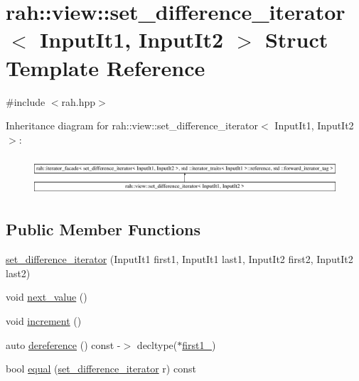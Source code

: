 \hypertarget{structrah_1_1view_1_1set__difference__iterator}{}\section{rah\+::view\+::set\+\_\+difference\+\_\+iterator$<$ Input\+It1, Input\+It2 $>$ Struct Template Reference}
\label{structrah_1_1view_1_1set__difference__iterator}


{\ttfamily \#include $<$rah.\+hpp$>$}

Inheritance diagram for rah\+::view\+::set\+\_\+difference\+\_\+iterator$<$ Input\+It1, Input\+It2 $>$\+:\begin{figure}[H]
\begin{center}
\leavevmode
\includegraphics[height=1.430396cm]{structrah_1_1view_1_1set__difference__iterator}
\end{center}
\end{figure}
\subsection*{Public Member Functions}
\begin{DoxyCompactItemize}
\item 
\mbox{\hyperlink{structrah_1_1view_1_1set__difference__iterator_a2aaa5bc00b8c0e21a9b4a4ae9fee4068}{set\+\_\+difference\+\_\+iterator}} (Input\+It1 first1, Input\+It1 last1, Input\+It2 first2, Input\+It2 last2)
\item 
void \mbox{\hyperlink{structrah_1_1view_1_1set__difference__iterator_a311ca6a6fef8424e24cb49536799a389}{next\+\_\+value}} ()
\item 
void \mbox{\hyperlink{structrah_1_1view_1_1set__difference__iterator_af897e8d202b7739f415ad97aa6dc4c6a}{increment}} ()
\item 
auto \mbox{\hyperlink{structrah_1_1view_1_1set__difference__iterator_a4e5a6bd5cce0bd3e4b22681bbb447361}{dereference}} () const -\/$>$ decltype($\ast$\mbox{\hyperlink{structrah_1_1view_1_1set__difference__iterator_a665b0687714ecb87cc12a60fe83a4a9c}{first1\+\_\+}})
\item 
bool \mbox{\hyperlink{structrah_1_1view_1_1set__difference__iterator_a9b673ba1f01c8fa13a9f640fd9bbfcb7}{equal}} (\mbox{\hyperlink{structrah_1_1view_1_1set__difference__iterator}{set\+\_\+difference\+\_\+iterator}} r) const
\end{DoxyCompactItemize}

